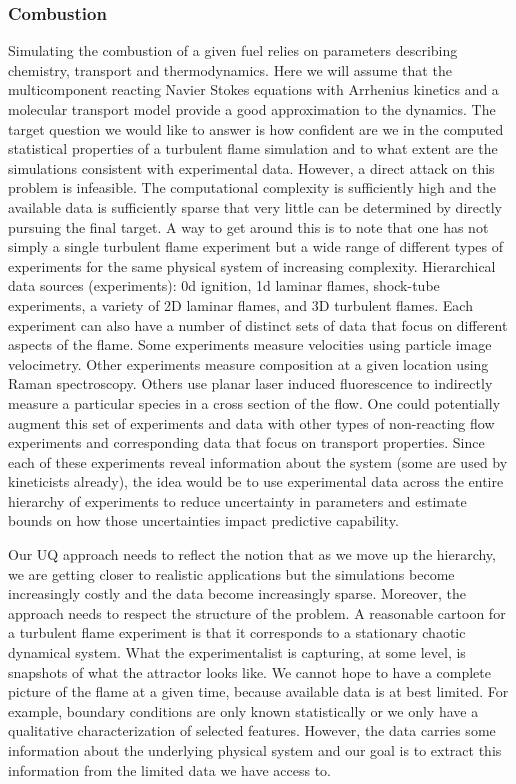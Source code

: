 \documentclass[11pt]{article}
\begin{document}
\subsubsection*{Combustion}
Simulating the combustion of a given fuel relies on parameters
describing chemistry, transport and thermodynamics.
Here we will assume that the multicomponent reacting Navier Stokes equations with Arrhenius
kinetics and a molecular transport model provide a good approximation to the dynamics.
The target question we would like to answer is how confident are we in the computed statistical
properties of a turbulent flame simulation and to what extent are the simulations consistent
with experimental data.
However, a direct attack on this problem is infeasible.
The computational complexity is sufficiently high and the available data is sufficiently
sparse that very little can be determined by directly pursuing the final target.
A way to get around this is to note that one has not simply a single turbulent flame
experiment but a wide range of different types of experiments for the same physical
system of increasing complexity.  
Hierarchical data sources (experiments): 0d ignition, 1d laminar flames, shock-tube experiments,
a variety of 2D laminar flames, and 3D turbulent flames.
Each experiment can also have a number of distinct sets of data that focus on different
aspects of the flame.
Some experiments measure velocities using particle image velocimetry. Other experiments
measure composition at a given location using Raman spectroscopy. Others use planar laser induced
fluorescence to indirectly measure a particular species in a cross section of the flow.
One could potentially augment this set of experiments and data with other types of non-reacting flow experiments and corresponding data that focus on transport properties. Since each of these experiments reveal information about the system (some are used by kineticists already), the idea would be to use experimental data across the entire hierarchy of experiments to reduce uncertainty in parameters and estimate bounds on how those uncertainties impact predictive capability.

Our UQ approach needs to reflect the notion that as we move up the hierarchy, we are
getting closer to realistic applications but the simulations become
increasingly costly and the data become increasingly sparse.
Moreover, the approach needs to respect the structure of the problem.
A reasonable cartoon for a 
turbulent flame experiment is that it corresponds to a stationary chaotic dynamical system.
What the experimentalist is capturing, at some level, is
snapshots of what the attractor looks like.
We cannot hope to have a complete picture of the flame at a given time, because available data is at best limited. For example, boundary conditions are only known statistically or we only have a qualitative characterization of selected features.
However, the data carries some information about the underlying physical system and our goal is to extract this information from the limited data we have access to.
\end{document}
